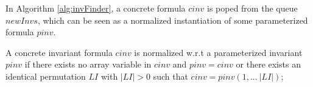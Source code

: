 \documentclass[conference]{IEEEtran}
\newcommand\lyj[1]{\textcolor{magenta}{ #1}}
\newcommand\caicomment[1]{\textcolor{red}{comment: #1} }
\begin{document}


In Algorithm \ref{alg:invFinder}, a concrete formula $cinv$ is poped from the queue $newInvs$, which can be seen as a normalized instantiation of some parameterized formula $pinv$. %


\begin{definition}
A  concrete invariant formula $cinv$ is normalized w.r.t a parameterized invariant $pinv$ if  there exists no array variable in $cinv$ and $pinv=cinv$ or there exists an identical permutation $LI$ with $|LI|>0$ such that $cinv=pinv(1,...~|LI|)$;

\end{definition}
\end{document}
